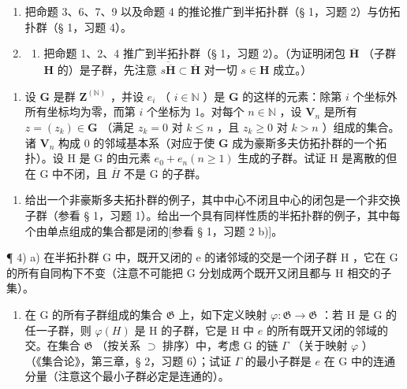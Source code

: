 \BourbakiExerciseGroup

\begin{enumerate}
\def\labelenumi{\arabic{enumi})}
\item
  把命题 3、6、7、9 以及命题 4 的推论推广到半拓扑群（§ 1，习题 2）与仿拓扑群（§ 1，习题 4）。
\item
  \begin{enumerate}
  \def\labelenumii{\alph{enumii})}
  \tightlist
  \item
    把命题 1、2、4 推广到半拓扑群（§ 1，习题 2）。（为证明闭包 \(\overline{\mathbf{H}}\) （子群 \(\mathbf{H}\) 的）是子群，先注意 \(\overline{s\overline{\mathbf{H}}} \subset \overline{\mathbf{H}}\) 对一切 \(s \in \mathbf{H}\) 成立。）
  \end{enumerate}
\end{enumerate}

\begin{enumerate}
\def\labelenumi{\alph{enumi})}
\setcounter{enumi}{1}
\tightlist
\item
  设 \(\mathbf{G}\) 是群 \(\mathbf{Z}^{(\mathbb{N})}\) ，并设 \(e_i\) （ \(i \in \mathbb{N}\) ）是 \(\mathbf{G}\) 的这样的元素：除第 \(i\) 个坐标外所有坐标均为零，而第 \(i\) 个坐标为 1。对每个 \(n \in \mathbb{N}\) ，设 \(\mathbf{V}_n\) 是所有 \(z = (z_k) \in \mathbf{G}\) （满足 \(z_k = 0\) 对 \(k \leqslant n\) ，且 \(z_k \geqslant 0\) 对 \(k > n\) ）组成的集合。诸 \(\mathbf{V}_n\) 构成 \(0\) 的邻域基本系（对应于使 \(\mathbf{G}\) 成为豪斯多夫仿拓扑群的一个拓扑）。设 H 是 G 的由元素 \(e_{0} + e_{n} (n \geqslant 1)\) 生成的子群。试证 H 是离散的但在 G 中不闭，且 \(\overline{H}\) 不是 G 的子群。
\end{enumerate}

\begin{enumerate}
\def\labelenumi{\arabic{enumi})}
\setcounter{enumi}{2}
\tightlist
\item
  给出一个非豪斯多夫拓扑群的例子，其中中心不闭且中心的闭包是一个非交换子群（参看 § 1，习题 1）。给出一个具有同样性质的半拓扑群的例子，其中每个由单点组成的集合都是闭的{[}参看 § 1，习题 2 b){]}。
\end{enumerate}

¶ 4) a) 在半拓扑群 G 中，既开又闭的 e 的诸邻域的交是一个闭子群 H ，它在 G 的所有自同构下不变（注意不可能把 G 分划成两个既开又闭且都与 H 相交的子集）。

\begin{enumerate}
\def\labelenumi{\alph{enumi})}
\setcounter{enumi}{1}
\tightlist
\item
  在 G 的所有子群组成的集合 \(\mathfrak{G}\) 上，如下定义映射 \(\varphi: \mathfrak{G} \to \mathfrak{G}\) ：若 H 是 G 的任一子群，则 \(\varphi(H)\) 是 H 的子群，它是 H 中 \(e\) 的所有既开又闭的邻域的交。在集合 \(\mathfrak{G}\) （按关系 \(\supset\) 排序）中，考虑 G 的链 \(\Gamma\) （关于映射 \(\varphi\) ） （《集合论》，第三章，§ 2，习题 6）；试证 \(\Gamma\) 的最小子群是 \(e\) 在 G 中的连通分量（注意这个最小子群必定是连通的）。
\end{enumerate}

